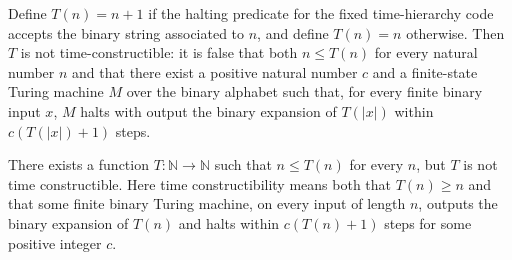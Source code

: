 \begin{theorem}
\label{Complexity.ntc_not_timeConstructible}
\leanok
{}
Define $T(n)=n+1$ if the halting predicate for the fixed time-hierarchy code accepts the
binary string associated to $n$, and define $T(n)=n$ otherwise. Then $T$ is not
time-constructible: it is false that both $n\le T(n)$ for every natural number $n$ and
that there exist a positive natural number $c$ and a finite-state Turing machine $M$
over the binary alphabet such that, for every finite binary input $x$, $M$ halts with
output the binary expansion of $T(|x|)$ within $c(T(|x|)+1)$ steps.
\end{theorem}

\begin{theorem}
\label{Complexity.exists_not_timeConstructible}
\leanok
{}
There exists a function $T:\mathbb{N}\to\mathbb{N}$ such that $n\le T(n)$ for every $n$,
but $T$ is not time constructible. Here time constructibility means both that $T(n)\ge
n$ and that some finite binary Turing machine, on every input of length $n$, outputs the
binary expansion of $T(n)$ and halts within $c(T(n)+1)$ steps for some positive integer
$c$.
\end{theorem}
